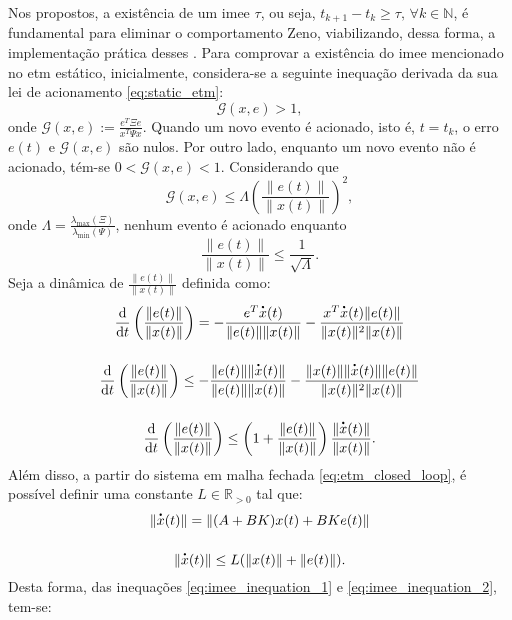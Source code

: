 Nos  propostos, a existência de um \acrshort{imee} $\tau$, ou seja, $t_{k+1} - t_k \geq \tau , \, \forall k \in \mathbb{N}$, é fundamental para eliminar o comportamento Zeno, viabilizando, dessa forma, a implementação prática desses . Para comprovar a existência do \acrshort{imee} mencionado no \acrshort{etm} estático, inicialmente, considera-se a seguinte inequação derivada da sua lei de acionamento \eqref{eq:static_etm}: \begin{equation}
  \mathcal{G}(x, e) > 1,
\end{equation} onde $\mathcal{G}(x, e) := \displaystyle \frac{e^T\Xi e}{x^T\Psi x}$. Quando um novo evento é acionado, isto é, $t = t_k$, o erro $e(t)$  e $\mathcal{G}(x, e)$ são nulos. Por outro lado, enquanto um novo evento não é acionado, tém-se $0 < \mathcal{G}(x, e) < 1$. Considerando que \begin{equation} \mathcal{G}(x, e) \leq \Lambda \left(\frac{\|e(t)\|}{\|x(t)\|}\right) ^ 2, \end{equation} onde $\Lambda = \displaystyle \frac{\lambda_{\max}(\Xi)}{\lambda_{\min}(\Psi)}$, nenhum evento é acionado enquanto \begin{equation}
  \frac{\|e(t)\|}{\|x(t)\|} \leq \frac{1}{\sqrt{\Lambda}}.
\end{equation} Seja a dinâmica de $\displaystyle \frac{\|e(t)\|}{\|x(t)\|}$ definida como: \begin{gather}
  \frac{\mathrm{d}}{\mathrm{d}t}\left(\frac{\|e(t)\|}{\|x(t)\|}\right) = - \frac{e^T\dt{x}(t)}{\|e(t)\|\|x(t)\|} - \frac{x^T\dt{x}(t) \|e(t)\|}{\|x(t)\|^2 \|x(t)\|} \notag \\[12pt]
  \frac{\mathrm{d}}{\mathrm{d}t}\left(\frac{\|e(t)\|}{\|x(t)\|}\right) \leq - \frac{\|e(t)\|\|\dt{x}(t)\|}{\|e(t)\|\|x(t)\|} - \frac{\|x(t)\| \|\dt{x}(t)\| \|e(t)\|}{\|x(t)\|^2 \|x(t)\|} \notag \\[12pt]
  \frac{\mathrm{d}}{\mathrm{d}t}\left(\frac{\|e(t)\|}{\|x(t)\|}\right) \leq \left( 1 + \frac{\|e(t)\|}{\|x(t)\|} \right) \frac{\|\dt{x}(t)\|}{\|x(t)\|}.
  \label{eq:imee_inequation_1}
\end{gather} Além disso, a partir do sistema em malha fechada \eqref{eq:etm_closed_loop}, é possível definir uma constante $L \in \mathbb{R}_{>0}$ tal que: \begin{gather}
  \|\dt{x}(t)\| = \| (A + BK) x(t) + BKe(t) \| \notag \\[12pt]
  \|\dt{x}(t)\| \leq L(\|x(t)\| + \|e(t)\|)
  \label{eq:imee_inequation_2}.
\end{gather} Desta forma, das inequações \eqref{eq:imee_inequation_1} e \eqref{eq:imee_inequation_2}, tem-se: \begin{gather}

\end{gather}
